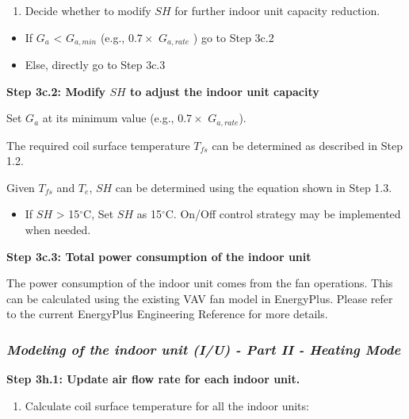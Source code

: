\begin{enumerate}
\def\labelenumi{\arabic{enumi})}
\setcounter{enumi}{3}
\tightlist
\item
  Decide whether to modify \(SH\) for further indoor unit capacity reduction.
\end{enumerate}

\begin{itemize}
\item
  If \(G_a\) \textless{} \(G_{a,min}\) (e.g., \(0.7\times\) \(G_{a,rate}\) ) go to Step 3c.2
\item
  Else, directly go to Step 3c.3
\end{itemize}

\textbf{Step 3c.2: Modify \(SH\) to adjust the indoor unit capacity}

Set \(G_a\) at its minimum value (e.g., \(0.7\times\) \(G_{a,rate}\)).

The required coil surface temperature \(T_{fs}\) can be determined as described in Step 1.2.

Given \(T_{fs}\) and \(T_e\), \(SH\) can be determined using the equation shown in Step 1.3.

\begin{itemize}
\tightlist
\item
  If \(SH\) \textgreater{} 15\(^{\circ}\)C, Set \(SH\) as 15\(^{\circ}\)C. On/Off control strategy may be implemented when needed.
\end{itemize}

\textbf{Step 3c.3: Total power consumption of the indoor unit}

The power consumption of the indoor unit comes from the fan operations. This can be calculated using the existing VAV fan model in EnergyPlus. Please refer to the current EnergyPlus Engineering Reference for more details.

\subsubsection{\emph{Modeling of the indoor unit (I/U) - Part II - Heating Mode}}\label{modeling-of-the-indoor-unit-iu---part-ii---heating-mode}

\textbf{Step 3h.1: Update air flow rate for each indoor unit.} 

\begin{enumerate}
\def\labelenumi{\arabic{enumi})}
\tightlist
\item
  Calculate coil surface temperature for all the indoor units:
\end{enumerate}


